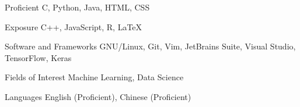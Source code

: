 

\begin{cvskills}

  \cvskill
    {Proficient} %
    {C, Python, Java, HTML, CSS} %

  \cvskill
    {Exposure} %
    {C++, JavaScript, R, LaTeX} %

  \cvskill
    {Software and Frameworks} %
    {GNU/Linux, Git, Vim, JetBrains Suite, Visual Studio, TensorFlow, Keras} %

  \cvskill
    {Fields of Interest} %
    {Machine Learning, Data Science} %

  \cvskill
    {Languages} %
    {English (Proficient), Chinese (Proficient)} %


\end{cvskills}
